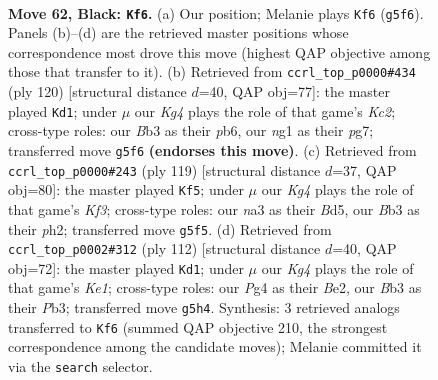 \documentclass[11pt]{article}
\begin{document}
\clearpage

\begin{figure}[p]\centering
\begin{subfigure}{0.46\textwidth}\centering
\resizebox{\linewidth}{!}{%
\newchessgame
\chessboard[
  setfen={8/4P3/p7/3P2kp/6p1/Nb2Q3/5P1q/5KN1 b - - 4 62},
  showmover=false,
  pgfstyle=straightmove, color=movearrow, markmove={g5-f6}
]}
\caption{}
\end{subfigure}\hfill
\begin{subfigure}{0.46\textwidth}\centering
\resizebox{\linewidth}{!}{%
\newchessgame
\chessboard[
  setfen={6k1/3Q2p1/1p6/p2P1p2/4q3/1P6/2K2P2/8 w - - 10 61},
  showmover=false,
  pgfstyle=straightmove, color=movearrow, markmove={c2-d1}
]}
\caption{}
\end{subfigure}
\\[4pt]
\begin{subfigure}{0.46\textwidth}\centering
\resizebox{\linewidth}{!}{%
\newchessgame
\chessboard[
  setfen={8/8/p1pQ1kp1/3b3p/P7/1P1P4/3NK2P/6q1 b - - 31 60},
  showmover=false,
  pgfstyle=straightmove, color=movearrow, markmove={f6-f5}
]}
\caption{}
\end{subfigure}\hfill
\begin{subfigure}{0.46\textwidth}\centering
\resizebox{\linewidth}{!}{%
\newchessgame
\chessboard[
  setfen={8/5Q2/1p3ppk/8/1p5p/1Pq4P/P3B3/4K3 w - - 34 57},
  showmover=false,
  pgfstyle=straightmove, color=movearrow, markmove={e1-d1}
]}
\caption{}
\end{subfigure}
\caption{\textbf{Move 62, Black: \texttt{Kf6}.} (a) Our position; Melanie plays \texttt{Kf6} (\texttt{g5f6}). Panels (b)--(d) are the retrieved master positions whose correspondence most drove this move (highest QAP objective among those that transfer to it). (b) Retrieved from \texttt{ccrl\_top\_p0000\#434} (ply 120) [structural distance $d$=40, QAP obj=77]: the master played \texttt{Kd1}; under $\mu$ our \emph{Kg4} plays the role of that game's \emph{Kc2}; cross-type roles: our \emph{B}b3 as their \emph{p}b6, our \emph{n}g1 as their \emph{p}g7; transferred move \texttt{g5f6} \textbf{(endorses this move)}. (c) Retrieved from \texttt{ccrl\_top\_p0000\#243} (ply 119) [structural distance $d$=37, QAP obj=80]: the master played \texttt{Kf5}; under $\mu$ our \emph{Kg4} plays the role of that game's \emph{Kf3}; cross-type roles: our \emph{n}a3 as their \emph{B}d5, our \emph{B}b3 as their \emph{p}h2; transferred move \texttt{g5f5}. (d) Retrieved from \texttt{ccrl\_top\_p0002\#312} (ply 112) [structural distance $d$=40, QAP obj=72]: the master played \texttt{Kd1}; under $\mu$ our \emph{Kg4} plays the role of that game's \emph{Ke1}; cross-type roles: our \emph{P}g4 as their \emph{B}e2, our \emph{B}b3 as their \emph{P}b3; transferred move \texttt{g5h4}. Synthesis: 3 retrieved analogs transferred to \texttt{Kf6} (summed QAP objective 210, the strongest correspondence among the candidate moves); Melanie committed it via the \texttt{search} selector.}
\label{fig:thought-m123}
\end{figure}
\end{document}

